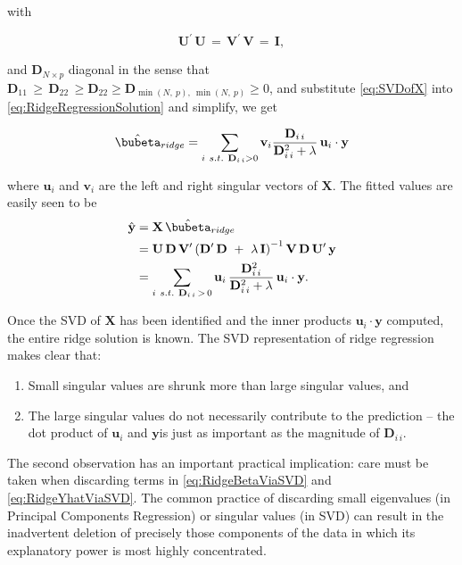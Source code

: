 \documentclass[graybox,envcountchap,sectrefs]{svmono}\usepackage[]{graphicx}\usepackage[]{xcolor}
\begin{document}
\begin{appendices}
with 

\begin{equation}
\mathrm{\mathbf{U}}^{\prime}\,\mathrm{\mathbf{U}}\,=\,\mathrm{\mathbf{V}}^{\prime}\,\mathrm{\mathbf{V}}\,=\,\mathrm{\mathbf{I}},\label{eq:UandVareOrthogonal}
\end{equation}

and $\mathrm{\mathbf{D}}_{N\times p}$ diagonal in the sense that
$\mathrm{\mathbf{D}}_{11}\,\geqslant\,\mathrm{\mathbf{D}}_{22}\,\geqslant\mathrm{\mathbf{D}}_{22}\geqslant\mathrm{\mathbf{D}}_{\min(N,\ p),\ \min(N,\ p)}\geqslant0$,
and substitute \ref{eq:SVDofX} into \ref{eq:RidgeRegressionSolution}
and simplify, we get

\begin{equation}
\hat{\bubeta}_{ridge}=\sum_{i\ s.t.\ \mathbf{D}_{i\,i}>0}\mathbf{v}_{i}\frac{\mathbf{D}_{i\,i}}{\mathbf{D}_{i\,i}^{2}+\lambda}\,\mathbf{u}_{i}\cdot\mathbf{y}\label{eq:RidgeBetaViaSVD}
\end{equation}

where $\mathbf{u}_{i}$ and $\mathbf{v}_{i}$ are the left and right
singular vectors of $\mathbf{X}$. The fitted values are easily seen
to be
\begin{align}
\hat{\mathrm{\mathbf{y}}} & =\mathbf{X}\,\hat{\bubeta}_{ridge}\nonumber \\
 & =\mathrm{\mathbf{U}}\,\mathrm{\mathbf{D}}\,\mathrm{\mathbf{V}}^{\prime}\left(\mathrm{\mathbf{D}}^{\prime}\,\mathrm{\mathbf{D}}\ +\ \lambda\,\mathbf{I}\right)^{-1}\mathrm{\mathbf{V}}\,\mathrm{\mathbf{D}}\,\mathrm{\mathbf{U}^{\prime}}\,\mathbf{y}\nonumber \\
 & =\sum_{i\ s.t.\ \mathbf{D}_{i\,i}\,>\,0}\mathbf{u}_{i}\,\frac{\mathbf{D}_{i\,i}^{2}}{\mathbf{D}_{i\,i}^{2}+\lambda}\,\mathbf{u}_{i}\cdot\mathbf{y}.\label{eq:RidgeYhatViaSVD}
\end{align}

Once the SVD of $\mathbf{X}$ has been identified and the inner products
$\mathbf{u}_{i}\cdot\mathbf{y}$ computed, the entire ridge solution
is known. The SVD representation of ridge regression makes clear that:
\begin{enumerate}
\item Small singular values are shrunk more than large singular values,
and
\item The large singular values do not necessarily contribute to the prediction
-- the dot product of $\mathbf{u}_{i}$ and $\mathbf{y}$is just
as important as the magnitude of $\mathbf{D}_{i\,i}$.
\end{enumerate}
The second observation has an important practical implication: care
must be taken when discarding terms in \eqref{eq:RidgeBetaViaSVD}
and \eqref{eq:RidgeYhatViaSVD}. The common practice of discarding
small eigenvalues (in Principal Components Regression) or singular
values (in SVD) can result in the inadvertent deletion of precisely
those components of the data in which its explanatory power is most
highly concentrated.


\end{appendices}
\end{document}

